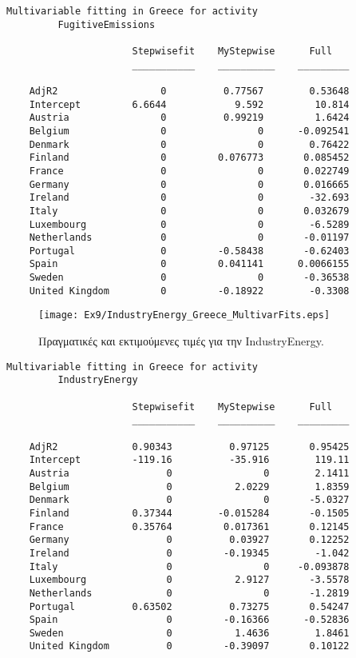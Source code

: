 \documentclass[11pt]{scrartcl} %
\begin{document}
\begin{Verbatim}[fontsize=\small]
Multivariable fitting in Greece for activity
 	 	 FugitiveEmissions

                      Stepwisefit    MyStepwise      Full   
                      ___________    __________    _________

    AdjR2                  0          0.77567        0.53648
    Intercept         6.6644            9.592         10.814
    Austria                0          0.99219         1.6424
    Belgium                0                0      -0.092541
    Denmark                0                0        0.76422
    Finland                0         0.076773       0.085452
    France                 0                0       0.022749
    Germany                0                0       0.016665
    Ireland                0                0        -32.693
    Italy                  0                0       0.032679
    Luxembourg             0                0        -6.5289
    Netherlands            0                0       -0.01197
    Portugal               0         -0.58438       -0.62403
    Spain                  0         0.041141      0.0066155
    Sweden                 0                0       -0.36538
    United Kingdom         0         -0.18922        -0.3308
\end{Verbatim}



\begin{figure}[H]

	\centering
	\texttt{[image: Ex9/IndustryEnergy\_Greece\_MultivarFits.eps]}	
\caption{Πραγματικές και εκτιμούμενες τιμές για την IndustryEnergy.}
\label{fig:z95} 
\end{figure}



\begin{Verbatim}[fontsize=\small]
Multivariable fitting in Greece for activity
 	 	 IndustryEnergy

                      Stepwisefit    MyStepwise      Full   
                      ___________    __________    _________

    AdjR2             0.90343          0.97125       0.95425
    Intercept         -119.16          -35.916        119.11
    Austria                 0                0        2.1411
    Belgium                 0           2.0229        1.8359
    Denmark                 0                0       -5.0327
    Finland           0.37344        -0.015284       -0.1505
    France            0.35764         0.017361       0.12145
    Germany                 0          0.03927       0.12252
    Ireland                 0         -0.19345        -1.042
    Italy                   0                0     -0.093878
    Luxembourg              0           2.9127       -3.5578
    Netherlands             0                0       -1.2819
    Portugal          0.63502          0.73275       0.54247
    Spain                   0         -0.16366      -0.52836
    Sweden                  0           1.4636        1.8461
    United Kingdom          0         -0.39097       0.10122
\end{Verbatim}
\end{document}
